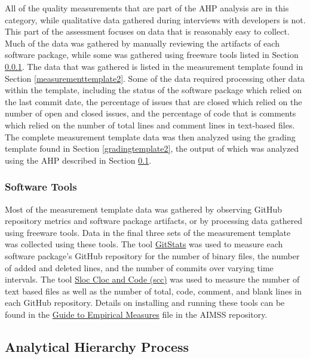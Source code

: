 \documentclass[12pt, notitlepage]{article}
\begin{document}
All of the quality measurements that are part of the AHP analysis are in this category, while qualitative data gathered during interviews with developers is not. This part of the assessment focuses on data that is reasonably easy to collect. Much of the data was gathered by manually reviewing the artifacts of each software package, while some was gathered using freeware tools listed in Section \ref{tools}. The data that was gathered is listed in the measurement template found in Section \ref{measurementtemplate2}. Some of the data required processing other data within the template, including the status of the software package which relied on the last commit date, the percentage of issues that are closed which relied on the number of open and closed issues, and the percentage of code that is comments which relied on the number of total lines and comment lines in text-based files. The complete measurement template data was then analyzed using the grading template found in Section \ref{gradingtemplate2}, the output of which was analyzed using the AHP described in Section \ref{AHP}.

\subsubsection{Software Tools}\label{tools}

Most of the measurement template data was gathered by observing GitHub repository metrics and software package artifacts, or by processing data gathered using freeware tools. Data in the final three sets of the measurement template was collected using these tools. The tool \href{https://github.com/tomgi/git_stats}{GitStats} was used to measure each software package's GitHub repository for the number of binary files, the number of added and deleted lines, and the number of commits over varying time intervals. The tool \href{https://github.com/boyter/scc}{Sloc Cloc and Code (scc)} was used to measure the number of text based files as well as the number of total, code, comment, and blank lines in each GitHub repository. Details on installing and running these tools can be found in the \href{https://github.com/smiths/AIMSS/blob/master/StateOfPractice/Methodology/A
	Guide to Empirical Measures.pdf} {Guide to Empirical Measures} file in the AIMSS repository. 

\subsection{Analytical Hierarchy Process}\label{AHP}
\end{document}
